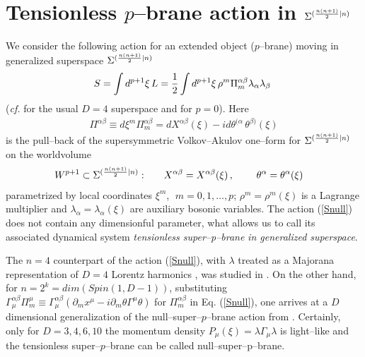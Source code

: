 \documentclass[a4paper,11pt]{article}
\begin{document}
\section{Tensionless $p$--brane action in $\Sigma^{({n(n+1)\over 2}|n)}$}
 
We consider the following 
action for an extended object ($p$--brane) moving in  generalized 
superspace $\Sigma^{({n(n+1)\over 2}|n)}$   
\begin{eqnarray}\label{Snull} 
S = \int d^{p+1}\xi \, L 
= {1\over 2} \int d^{p+1}\xi \, \rho^m \Pi_m^{\alpha\beta} 
\lambda_{\alpha}\lambda_{\beta} \; 
\end{eqnarray}
({\it cf.} \cite{BZ} for the usual $D=4$ superspace and \cite{B90} 
for $p=0$). 
Here 
\begin{eqnarray}\label{Pi} 
\Pi^{\alpha\beta} \equiv d\xi^m \Pi_m^{\alpha\beta} = 
dX^{\alpha\beta}(\xi) - i d\theta^{(\alpha}\,\theta^{\beta )}(\xi) 
\end{eqnarray}
is the pull--back of the supersymmetric Volkov--Akulov one--form for 
$\Sigma^{({n(n+1)\over 2}|n)}$ on the worldvolume   
\begin{eqnarray}\label{Wp} 
W^{p+1} \subset \Sigma^{({n(n+1)\over 2}|n)}: & \qquad 
X^{\alpha\beta}=X^{\alpha\beta}(\xi)\, , \; \qquad 
\theta^{\alpha}=\theta^{\alpha}(\xi)
\end{eqnarray} 
parametrized by local coordinates $\xi^m$, $\; m=0,1,\ldots , p$; 
$\rho^m= \rho^m(\xi)$ is a Lagrange multiplier and 
$\lambda_{\alpha}= \lambda_{\alpha}(\xi)$ are auxiliary bosonic 
variables. 
The action (\ref{Snull}) does not contain any dimensionful parameter, 
what  allows us to call its associated dynamical system 
{\sl tensionless super--p--brane}  
{\sl in generalized superspace}. 



The $n=4$ counterpart of the action 
(\ref{Snull}), with $\lambda$ treated as a Majorana representation of  
$D=4$ Lorentz harmonics \cite{B90}, was studied in \cite{ZU}. 
On the other hand, for $n=2^k=dim(Spin(1,D-1))$, 
substituting $\Gamma_\mu^{\alpha\beta}\Pi_m^\mu
\equiv \Gamma_\mu^{\alpha\beta} (\partial_mx^\mu - i  
\partial_m\theta \Gamma^\mu \theta)$ for $\Pi_m^{\alpha\beta}$ in  
Eq. (\ref{Snull}), one arrives at a $D$ dimensional generalization of 
the null--super--$p$--brane action from \cite{BZ}. Certainly, only 
for $D=3,4,6,10$ the momentum density $P_\mu(\xi)= 
\lambda \Gamma_\mu \lambda$ is light--like 
and the tensionless super--$p$--brane can be called  null--super--p--brane. 
\end{document}
